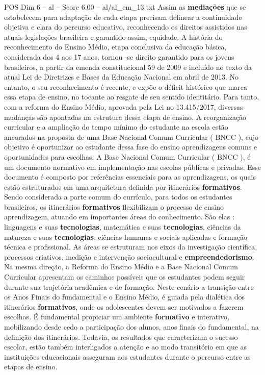 \begin{textsample}{POS Dim 6 – al – Score 6.00 – al/al\_em\_13.txt}
Assim as \textbf{mediações} que se estabelecem para adaptação de cada etapa precisam delinear a continuidade objetiva e clara do percurso educativo, reconhecendo os direitos assistidos nas atuais legislações brasileira e garantido assim, equidade.
A história do reconhecimento do Ensino Médio, etapa conclusiva da educação básica, considerada dos 4 aos 17 anos, tornou -se direito garantido para os jovens brasileiros, a partir da emenda constitucional 59 de 2009 e incluído no texto da atual Lei de Diretrizes e Bases da Educação Nacional em abril de 2013.
No entanto, o seu reconhecimento é recente, e expõe o déficit histórico que marca essa etapa de ensino, no tocante ao resgate de seu sentido identitário.
Para tanto, com a reforma do Ensino Médio, aprovada pela Lei no 13.415/2017, diversas mudanças são apontadas na estrutura dessa etapa de ensino.
A reorganização curricular e a ampliação do tempo mínimo do estudante na escola estão ancorados na proposta de uma Base Nacional Comum Curricular ( BNCC ), cujo objetivo é oportunizar ao estudante dessa fase do ensino aprendizagens comuns e oportunidades para escolhas.
A Base Nacional Comum Curricular ( BNCC ), é um documento normativo em implementação nas escolas públicas e privadas.
Esse documento é composto por referências essenciais para as aprendizagens, os quais estão estruturados em uma arquitetura definida por itinerários \textbf{formativos}.
Sendo considerada a parte comum do currículo, para todos os estudantes brasileiros, os itinerários \textbf{formativos} flexibilizam o processo de ensino aprendizagem, atuando em importantes áreas do conhecimento.
São elas : linguagens e suas \textbf{tecnologias}, matemática e suas \textbf{tecnologias}, ciências da natureza e suas \textbf{tecnologias}, ciências humanas e sociais aplicadas e formação técnica e profissional.
As áreas se estruturam nos eixos da investigação científica, processos criativos, medição e intervenção sociocultural e \textbf{empreendedorismo}.
Na mesma direção, a Reforma do Ensino Médio e a Base Nacional Comum Curricular apresentam os caminhos possíveis que os estudantes podem seguir durante sua trajetória acadêmica e de formação.
Neste cenário a transição entre os Anos Finais do fundamental e o Ensino Médio, é guiada pela dialética dos itinerários \textbf{formativos}, onde os adolescentes devem ser motivados a fazerem escolhas.
É fundamental propiciar um ambiente \textbf{formativo} e interativo, mobilizando desde cedo a participação dos alunos, anos finais do fundamental, na definição dos itinerários.
Todavia, os resultados que caracterizam o sucesso escolar, estão também interligados a atenção e ao modo transitório em que as instituições educacionais asseguram aos estudantes durante o percurso entre as etapas de ensino.

\end{textsample}
